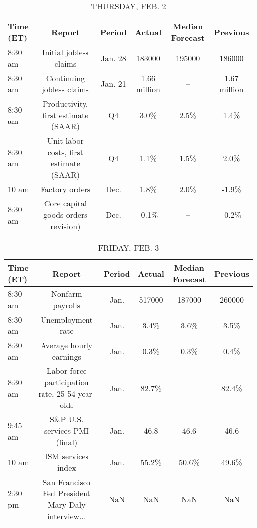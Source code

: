 \documentclass{article}%
\begin{document}
\begin{table}[htbp]%
\caption{THURSDAY, FEB. 2}%
\centering%
\begin{adjustbox}{width=1\textwidth}%
\begin{tabular}{lccccc}
\toprule
Time (ET) &                                  Report &  Period &       Actual & Median Forecast &     Previous \\
\midrule
  8:30 am &                  Initial jobless claims & Jan. 28 &       183000 &          195000 &       186000 \\
  8:30 am &               Continuing jobless claims & Jan. 21 & 1.66 million &              -- & 1.67 million \\
  8:30 am &     Productivity, first estimate (SAAR) &      Q4 &         3.0\% &            2.5\% &         1.4\% \\
  8:30 am & Unit labor costs, first estimate (SAAR) &      Q4 &         1.1\% &            1.5\% &         2.0\% \\
    10 am &                          Factory orders &    Dec. &         1.8\% &            2.0\% &        -1.9\% \\
  8:30 am &     Core capital goods orders revision) &    Dec. &        -0.1\% &              -- &        -0.2\% \\
\bottomrule
\end{tabular}
%
\end{adjustbox}%
\end{table}

%


\begin{table}[htbp]%
\caption{FRIDAY, FEB. 3}%
\centering%
\begin{adjustbox}{width=1\textwidth}%
\begin{tabular}{lccccc}
\toprule
Time (ET) &                                             Report & Period & Actual & Median Forecast & Previous \\
\midrule
  8:30 am &                                   Nonfarm payrolls &   Jan. & 517000 &          187000 &   260000 \\
  8:30 am &                                  Unemployment rate &   Jan. &   3.4\% &            3.6\% &     3.5\% \\
  8:30 am &                            Average hourly earnings &   Jan. &   0.3\% &            0.3\% &     0.4\% \\
  8:30 am &    Labor-force participation rate, 25-54 year-olds &   Jan. &  82.7\% &              -- &    82.4\% \\
  9:45 am &                      S\&P U.S. services PMI (final) &   Jan. &   46.8 &            46.6 &     46.6 \\
    10 am &                                 ISM services index &   Jan. &  55.2\% &           50.6\% &    49.6\% \\
  2:30 pm & San Francisco Fed President Mary Daly interview... &    NaN &    NaN &             NaN &      NaN \\
\bottomrule
\end{tabular}
%
\end{adjustbox}%
\end{table}
\end{document}
